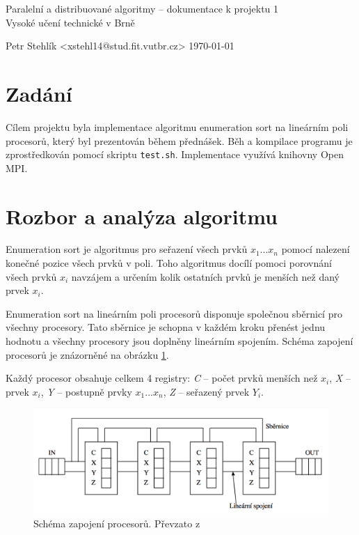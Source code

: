 \documentclass[11pt,a4paper]{article}
\begin{document}
\begin{center}
	\LARGE{Paralelní a distribuované algoritmy -- dokumentace k projektu 1}\\
	\large{Vysoké učení technické v Brně}
	\vspace{0.2cm}

	Petr Stehlík <xstehl14@stud.fit.vutbr.cz>     \today

\end{center}

\section{Zadání}

Cílem projektu byla implementace algoritmu enumeration sort na lineárním poli procesorů, který byl prezentován během přednášek. Běh a kompilace programu je zprostředkován pomocí skriptu \texttt{test.sh}. Implementace využívá knihovny Open MPI\cite{bib:openmpi}.


\section{Rozbor a analýza algoritmu}

Enumeration sort je algoritmus pro seřazení všech prvků $x_1...x_n$ pomocí nalezení konečné pozice všech prvků v poli. Toho algoritmus docílí pomoci porovnání všech prvků $x_i$ navzájem a určením kolik ostatních prvků je menších než daný prvek $x_i$.

Enumeration sort na lineárním poli procesorů disponuje společnou sběrnicí pro všechny procesory. Tato sběrnice je schopna v každém kroku přenést jednu hodnotu a všechny procesory jsou doplněny lineárním spojením. Schéma zapojení procesorů je znázorněné na obrázku \ref{schema}.

Každý procesor obsahuje celkem 4 registry: \textit{C} -- počet prvků menších než $x_i$, \textit{X} -- prvek $x_i$, \textit{Y} -- postupně prvky $x_1 ... x_n$, \textit{Z} -- seřazený prvek $Y_i$.

\begin{figure}[h]
    \includegraphics[width=0.7\linewidth]{schema}
    \centering
    \caption{Schéma zapojení procesorů. Převzato z \cite{bib:schema}}
    \label{schema}
\end{figure}
\end{document}
